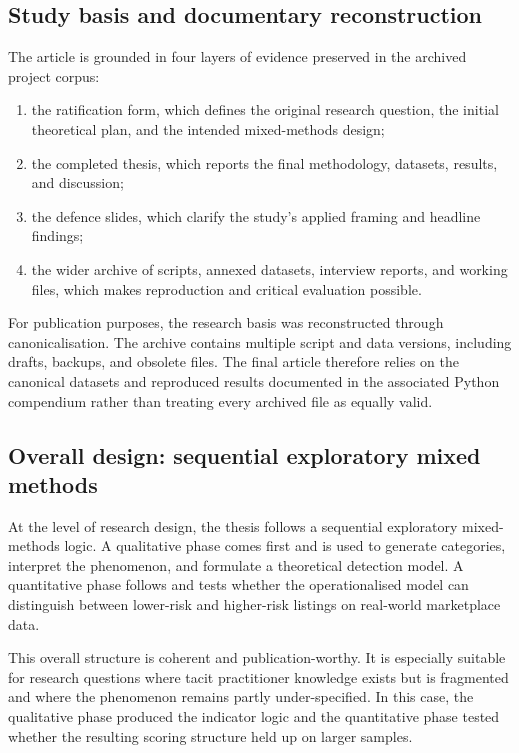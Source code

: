 \documentclass[11pt,a4paper]{article}
\begin{document}
\subsection{Study basis and documentary reconstruction}
The article is grounded in four layers of evidence preserved in the archived project corpus:
\begin{enumerate}
    \item the ratification form, which defines the original research question, the initial theoretical plan, and the intended mixed-methods design;
    \item the completed thesis, which reports the final methodology, datasets, results, and discussion;
    \item the defence slides, which clarify the study's applied framing and headline findings;
    \item the wider archive of scripts, annexed datasets, interview reports, and working files, which makes reproduction and critical evaluation possible.
\end{enumerate}

For publication purposes, the research basis was reconstructed through canonicalisation. The archive contains multiple script and data versions, including drafts, backups, and obsolete files. The final article therefore relies on the canonical datasets and reproduced results documented in the associated Python compendium rather than treating every archived file as equally valid.

\subsection{Overall design: sequential exploratory mixed methods}
At the level of research design, the thesis follows a sequential exploratory mixed-methods logic. A qualitative phase comes first and is used to generate categories, interpret the phenomenon, and formulate a theoretical detection model. A quantitative phase follows and tests whether the operationalised model can distinguish between lower-risk and higher-risk listings on real-world marketplace data.

This overall structure is coherent and publication-worthy. It is especially suitable for research questions where tacit practitioner knowledge exists but is fragmented and where the phenomenon remains partly under-specified. In this case, the qualitative phase produced the indicator logic and the quantitative phase tested whether the resulting scoring structure held up on larger samples.
\end{document}
